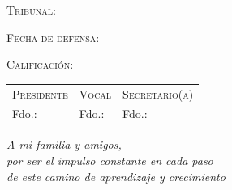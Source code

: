 \begin{titlepage}
	{\flushright \LARGE \textsc{Tribunal:}}

	\hspace*{1cm}{\Large Presidente: \hrulefill}

	\hspace*{1cm}{\Large Vocal: \hrulefill}

	\hspace*{1cm}{\Large Secretario(a): \hrulefill}

	{\flushright \LARGE \textsc{Fecha de defensa:} \hrulefill}

	{\flushright \LARGE \textsc{Calificación:} \hrulefill}

	\begin{center}
		\begin{tabularx}{\linewidth}{X X X}
			{\large \textsc{Presidente}} & {\large \textsc{Vocal}} & {\large \textsc{Secretario(a)}}\\[2.5cm]
			Fdo.: & Fdo.: & Fdo.:
		\end{tabularx}
	\end{center}
	\cleardoublepage
\end{titlepage}


\null{}
\begin{flushright}
\emph{A mi familia y amigos,\\por ser el impulso constante en cada paso\\de este camino de aprendizaje y crecimiento}
\end{flushright}
\null
\cleardoublepage

%
